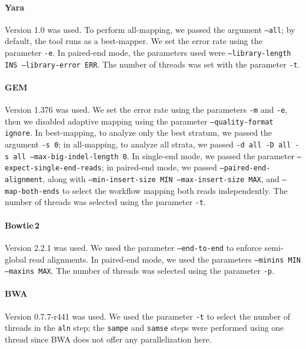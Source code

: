 \paragraph{Yara}
Version 1.0 was used.
To perform all-mapping, we passed the argument \texttt{--all}; by default, the tool runs as a best-mapper.
We set the error rate using the parameter \texttt{-e}.
In paired-end mode, the parameters used were \texttt{--library-length INS --library-error ERR}.
The number of threads was set with the parameter \texttt{-t}.

\paragraph{GEM}
Version 1.376 was used.
We set the error rate using the parameters \texttt{-m} and \texttt{-e}, then we disabled adaptive mapping using the parameter \texttt{--quality-format ignore}.
In best-mapping, to analyze only the best stratum, we passed the argument \texttt{-s 0};
in all-mapping, to analyze all strata, we passed \texttt{-d all -D all -s all --max-big-indel-length 0}.
In single-end mode, we passed the parameter \texttt{--expect-single-end-reads}; in paired-end mode, we passed \texttt{--paired-end-alignment}, along with \texttt{--min-insert-size MIN --max-insert-size MAX}, and \texttt{--map-both-ends} to select the workflow mapping both reads independently.
The number of threads was selected using the parameter \texttt{-t}.

\paragraph{Bowtie\,2}
Version 2.2.1 was used.
We used the parameter \texttt{--end-to-end} to enforce semi-global read alignments.
In paired-end mode, we used the parameters \texttt{--minins MIN --maxins MAX}.
The number of threads was selected using the parameter \texttt{-p}.

\paragraph{BWA}
Version 0.7.7-r441 was used.
We used the parameter \texttt{-t} to select the number of threads in the \texttt{aln} step;
the \texttt{sampe} and \texttt{samse} steps were performed using one thread since BWA does not offer any parallelization here.

